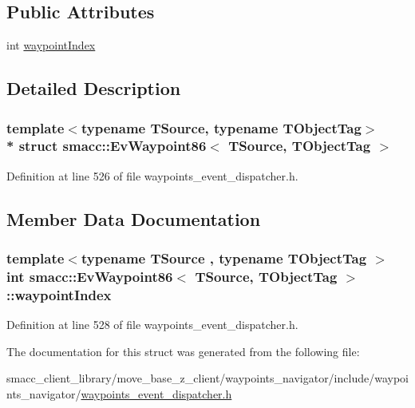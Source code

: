 \subsection*{Public Attributes}
\begin{DoxyCompactItemize}
\item 
int \hyperlink{structsmacc_1_1EvWaypoint86_a4be4f342a1bb78795e79340d9e73d65c}{waypoint\+Index}
\end{DoxyCompactItemize}


\subsection{Detailed Description}
\subsubsection*{template$<$typename T\+Source, typename T\+Object\+Tag$>$\\*
struct smacc\+::\+Ev\+Waypoint86$<$ T\+Source, T\+Object\+Tag $>$}



Definition at line 526 of file waypoints\+\_\+event\+\_\+dispatcher.\+h.



\subsection{Member Data Documentation}
\subsubsection[{\texorpdfstring{waypoint\+Index}{waypointIndex}}]{\setlength{\rightskip}{0pt plus 5cm}template$<$typename T\+Source , typename T\+Object\+Tag $>$ int {\bf smacc\+::\+Ev\+Waypoint86}$<$ T\+Source, T\+Object\+Tag $>$\+::waypoint\+Index}\hypertarget{structsmacc_1_1EvWaypoint86_a4be4f342a1bb78795e79340d9e73d65c}{}\label{structsmacc_1_1EvWaypoint86_a4be4f342a1bb78795e79340d9e73d65c}


Definition at line 528 of file waypoints\+\_\+event\+\_\+dispatcher.\+h.



The documentation for this struct was generated from the following file\+:\begin{DoxyCompactItemize}
\item 
smacc\+\_\+client\+\_\+library/move\+\_\+base\+\_\+z\+\_\+client/waypoints\+\_\+navigator/include/waypoints\+\_\+navigator/\hyperlink{waypoints__event__dispatcher_8h}{waypoints\+\_\+event\+\_\+dispatcher.\+h}\end{DoxyCompactItemize}
